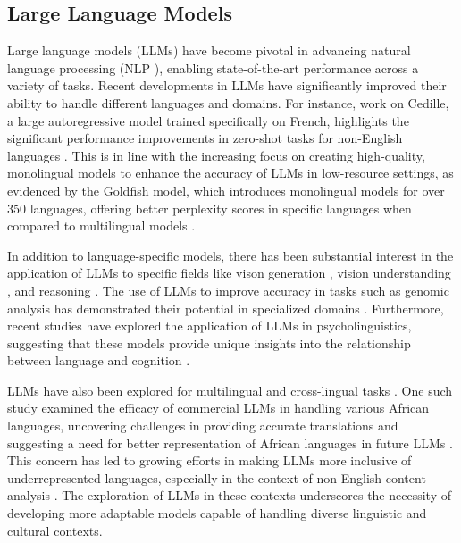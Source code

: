 \subsection{Large Language Models}

Large language models (LLMs) have become pivotal in advancing natural language processing (NLP \cite{zhou2022claret,zhou2024fine,zhou2022eventbert}), enabling state-of-the-art performance across a variety of tasks. Recent developments in LLMs have significantly improved their ability to handle different languages and domains. For instance, work on Cedille, a large autoregressive model trained specifically on French, highlights the significant performance improvements in zero-shot tasks for non-English languages \cite{cedille2022}. This is in line with the increasing focus on creating high-quality, monolingual models to enhance the accuracy of LLMs in low-resource settings, as evidenced by the Goldfish model, which introduces monolingual models for over 350 languages, offering better perplexity scores in specific languages when compared to multilingual models \cite{goldfish2024}.

In addition to language-specific models, there has been substantial interest in the application of LLMs to specific fields like vison generation \cite{zhou2024less}, vision understanding \cite{zhou2023style}, and reasoning \cite{zhou2021modeling}. The use of LLMs to improve accuracy in tasks such as genomic analysis has demonstrated their potential in specialized domains \cite{bioinformatics2024}. Furthermore, recent studies have explored the application of LLMs in psycholinguistics, suggesting that these models provide unique insights into the relationship between language and cognition \cite{psycholinguistics2023}.

LLMs have also been explored for multilingual and cross-lingual tasks \cite{zhou2021improving}. One such study examined the efficacy of commercial LLMs in handling various African languages, uncovering challenges in providing accurate translations and suggesting a need for better representation of African languages in future LLMs \cite{africanlanguages2023}. This concern has led to growing efforts in making LLMs more inclusive of underrepresented languages, especially in the context of non-English content analysis \cite{translation2023}. The exploration of LLMs in these contexts underscores the necessity of developing more adaptable models capable of handling diverse linguistic and cultural contexts.